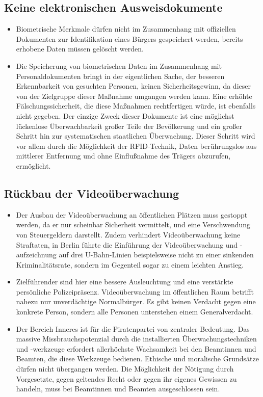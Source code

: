 \documentclass[10pt,a4paper,twocolumn,twoside,titlepage]{article}
\begin{document}
\subsection{Keine elektronischen Ausweisdokumente}
\begin{itemize}
\item Biometrische Merkmale dürfen nicht im Zusammenhang mit offiziellen Dokumenten zur Identifikation eines Bürgers gespeichert werden, bereits erhobene Daten müssen gelöscht werden.
\item Die Speicherung von biometrischen Daten im Zusammenhang mit Personaldokumenten bringt in der eigentlichen Sache, der besseren Erkennbarkeit von gesuchten Personen, keinen Sicherheitsgewinn, da dieser von der Zielgruppe dieser Maßnahme umgangen werden kann. Eine erhöhte Fälschungssicherheit, die diese Maßnahmen rechtfertigen würde, ist ebenfalls nicht gegeben. Der einzige Zweck dieser Dokumente ist eine möglichst lückenlose Überwachbarkeit großer Teile der Bevölkerung und ein großer Schritt hin zur systematischen staatlichen Überwachung. Dieser Schritt wird vor allem durch die Möglichkeit der RFID-Technik, Daten berührungslos aus mittlerer Entfernung und ohne Einflußnahme des Trägers abzurufen, ermöglicht.
\end{itemize}

\subsection{Rückbau der Videoüberwachung}
\begin{itemize}
\item Der Ausbau der Videoüberwachung an öffentlichen Plätzen muss gestoppt werden, da er nur scheinbar Sicherheit vermittelt, und eine Verschwendung von Steuergeldern darstellt. Zudem verhindert Videoüberwachung keine Straftaten, in Berlin führte die Einführung der Videoüberwachung und -aufzeichnung auf drei U-Bahn-Linien beispielsweise nicht zu einer sinkenden Kriminalitätsrate, sondern im Gegenteil sogar zu einem leichten Anstieg.
\item Zielführender sind hier eine bessere Ausleuchtung und eine verstärkte persönliche Polizeipräsenz. Videoüberwachung im öffentlichen Raum betrifft nahezu nur unverdächtige Normalbürger. Es gibt keinen Verdacht gegen eine konkrete Person, sondern alle Personen unterstehen einem Generalverdacht.
\end{itemize}


\begin{itemize}
\item Der Bereich Inneres ist für die Piratenpartei von zentraler Bedeutung. Das massive Missbrauchspotenzial durch die installierten Überwachungstechniken und -werkzeuge erfordert allerhöchste Wachsamkeit bei den Beamtinnen und Beamten, die diese Werkzeuge bedienen. Ethische und moralische Grundsätze dürfen nicht übergangen werden. Die Möglichkeit der Nötigung durch Vorgesetzte, gegen geltendes Recht oder gegen ihr eigenes Gewissen zu handeln, muss bei Beamtinnen und Beamten ausgeschlossen sein.
\end{itemize}
\end{document}
